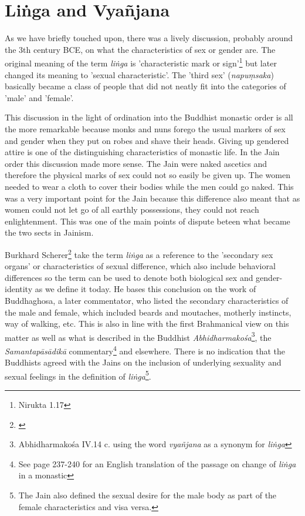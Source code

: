 \section{Liṅga and Vyañjana}

As we have briefly touched upon, there was a lively discussion, probably around the 3th century BCE, on what the characteristics of sex or gender are. The original meaning of the term {\em liṅga} is 'characteristic mark or sign'\footnote{Nirukta 1.17} but later changed its meaning to 'sexual characteristic'. The 'third sex' ({\em napuṃsaka}) basically became a class of people that did not neatly fit into the categories of 'male' and 'female'. 

This discussion in the light of ordination into the Buddhist monastic order is all the more remarkable because monks and nuns forego the usual markers of sex and gender when they put on robes and shave their heads. Giving up gendered attire is one of the distinguishing characteristics of monastic life. In the Jain order this discussion made more sense. The Jain were naked ascetics and therefore the physical marks of sex could not so easily be given up. The women needed to wear a cloth to cover their bodies while the men could go naked. This was a very important point for the Jain because this difference also meant that as women could not let go of all earthly possessions, they could not reach enlightenment. This was one of the main points of dispute beteen what became the two sects in Jainism.

Burkhard Scherer\footnote{\cite{scherer}} take the term {\em liṅga} as a reference to the 'secondary sex organs' or characteristics of sexual difference, which also include behavioral differences so the term can be used to denote both biological sex and gender-identity as we define it today. He bases this conclusion on the work of Buddhaghosa, a later commentator, who listed the secondary characteristics of the male and female, which included beards and moutaches, motherly instincts, way of walking, etc. This is also in line with the first Brahmanical view on this matter as well as what is described in the Buddhist {\em Abhidharmakośa}\footnote{Abhidharmakośa IV.14 c. using the word {\em vyañjana} as a synonym for {\em liṅga}}, the {\em Samantapāsādikā} commentary\footnote{See \cite{anderson2016} page 237-240 for an English translation of the passage on change of {\em liṅga} in a monastic} and elsewhere. There is no indication that the Buddhists agreed with the Jains on the inclusion of underlying sexuality and sexual feelings in the definition of {\em liṅga}\footnote{The Jain also defined the sexual desire for the male body as part of the female characteristics and visa versa.}.

